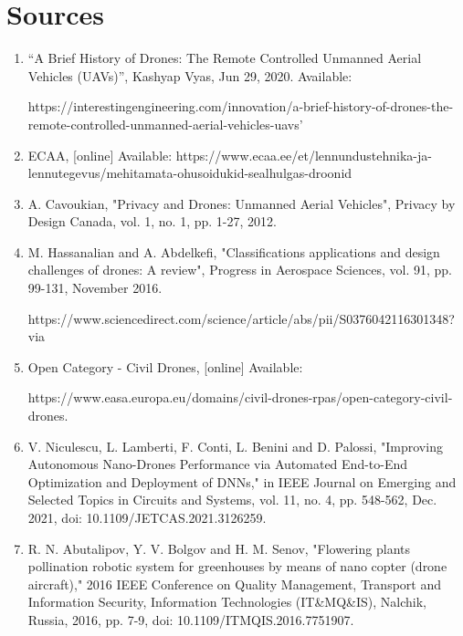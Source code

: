 \documentclass{article}
\begin{document}
\section{Sources}
\begin{enumerate}
    \item 
    “A Brief History of Drones: The Remote Controlled Unmanned Aerial Vehicles (UAVs)”, Kashyap Vyas, Jun 29, 2020. Available: 
    
    https://interestingengineering.com/innovation/a-brief-history-of-drones-the-remote-controlled-unmanned-aerial-vehicles-uavs'
    \item
    ECAA, [online] Available: https://www.ecaa.ee/et/lennundustehnika-ja-lennutegevus/mehitamata-ohusoidukid-sealhulgas-droonid  
    \item
    A. Cavoukian, "Privacy and Drones: Unmanned Aerial Vehicles", Privacy by Design Canada, vol. 1, no. 1, pp. 1-27, 2012.  
    \item
    M. Hassanalian and A. Abdelkefi, "Classifications applications and design challenges of drones: A review", Progress in Aerospace Sciences, vol. 91, pp. 99-131, November 2016.
    
    https://www.sciencedirect.com/science/article/abs/pii/S0376042116301348?via%
    
    \item
    Open Category - Civil Drones, [online] Available: 
    
    https://www.easa.europa.eu/domains/civil-drones-rpas/open-category-civil-drones.
    \item
    V. Niculescu, L. Lamberti, F. Conti, L. Benini and D. Palossi, "Improving Autonomous Nano-Drones Performance via Automated End-to-End Optimization and Deployment of DNNs," in IEEE Journal on Emerging and Selected Topics in Circuits and Systems, vol. 11, no. 4, pp. 548-562, Dec. 2021, doi: 10.1109/JETCAS.2021.3126259. 
    \item
    R. N. Abutalipov, Y. V. Bolgov and H. M. Senov, "Flowering plants pollination robotic system for greenhouses by means of nano copter (drone aircraft)," 2016 IEEE Conference on Quality Management, Transport and Information Security, Information Technologies (IT&MQ&IS), Nalchik, Russia, 2016, pp. 7-9, doi: 10.1109/ITMQIS.2016.7751907. 
\end{enumerate}
\end{document}
